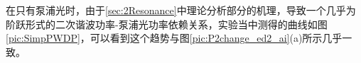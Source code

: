 \documentclass[UTF8,a4paper,cs4size,hyperref]{ctexart}
\begin{document}
在只有泵浦光时，由于\ref{sec:2Resonance}中理论分析部分的机理，导致一个几乎为阶跃形式的二次谐波功率-泵浦光功率依赖关系，实验当中测得的曲线如图\ref{pic:SimpPWDP}，可以看到这个趋势与图\ref{pic:P2change_ed2_ai}(a)所示几乎一致。






\newpage

\end{document}
